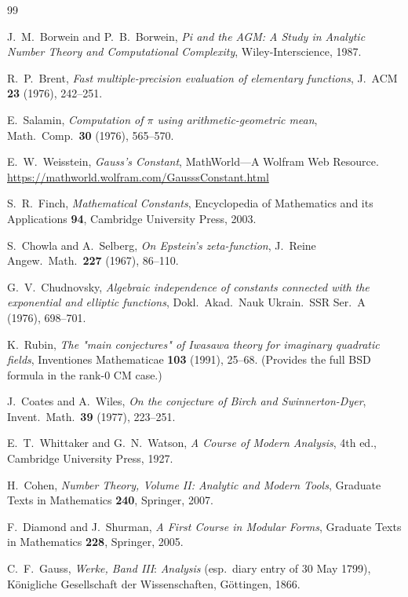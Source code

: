 \documentclass[11pt]{article}
\theoremstyle{definition}
\theoremstyle{remark}
\begin{document}
\begin{thebibliography}{99}

J.~M.\ Borwein and P.~B.\ Borwein,
\emph{Pi and the AGM: A Study in Analytic Number Theory and Computational Complexity},
Wiley-Interscience, 1987.

R.~P.\ Brent,
\textit{Fast multiple-precision evaluation of elementary functions},
J.\ ACM \textbf{23} (1976), 242--251.

E.\ Salamin,
\textit{Computation of $\pi$ using arithmetic-geometric mean},
Math.\ Comp.\ \textbf{30} (1976), 565--570.

E.~W.\ Weisstein,
\textit{Gauss's Constant}, MathWorld---A Wolfram Web Resource.
\url{https://mathworld.wolfram.com/GausssConstant.html}

S.~R.\ Finch,
\emph{Mathematical Constants},
Encyclopedia of Mathematics and its Applications \textbf{94},
Cambridge University Press, 2003.

S.\ Chowla and A.\ Selberg,
\textit{On Epstein's zeta-function},
J.\ Reine Angew.\ Math.\ \textbf{227} (1967), 86--110.

G.~V.\ Chudnovsky,
\textit{Algebraic independence of constants connected with the exponential and elliptic functions},
Dokl.\ Akad.\ Nauk Ukrain.\ SSR Ser.\ A (1976), 698--701.

K.\ Rubin,
\textit{The "main conjectures" of Iwasawa theory for imaginary quadratic fields},
Inventiones Mathematicae \textbf{103} (1991), 25--68.
(Provides the full BSD formula in the rank-$0$ CM case.)

J.\ Coates and A.\ Wiles,
\textit{On the conjecture of Birch and Swinnerton-Dyer},
Invent.\ Math.\ \textbf{39} (1977), 223--251.

E.~T.\ Whittaker and G.~N.\ Watson,
\emph{A Course of Modern Analysis},
4th ed., Cambridge University Press, 1927.

H.\ Cohen,
\emph{Number Theory, Volume II: Analytic and Modern Tools},
Graduate Texts in Mathematics \textbf{240}, Springer, 2007.

F.\ Diamond and J.\ Shurman,
\emph{A First Course in Modular Forms},
Graduate Texts in Mathematics \textbf{228}, Springer, 2005.

C.~F.\ Gauss,
\emph{Werke, Band III}: \emph{Analysis} (esp.\ diary entry of 30 May 1799),
K\"onigliche Gesellschaft der Wissenschaften, G\"ottingen, 1866.


\end{thebibliography}
\end{document}
